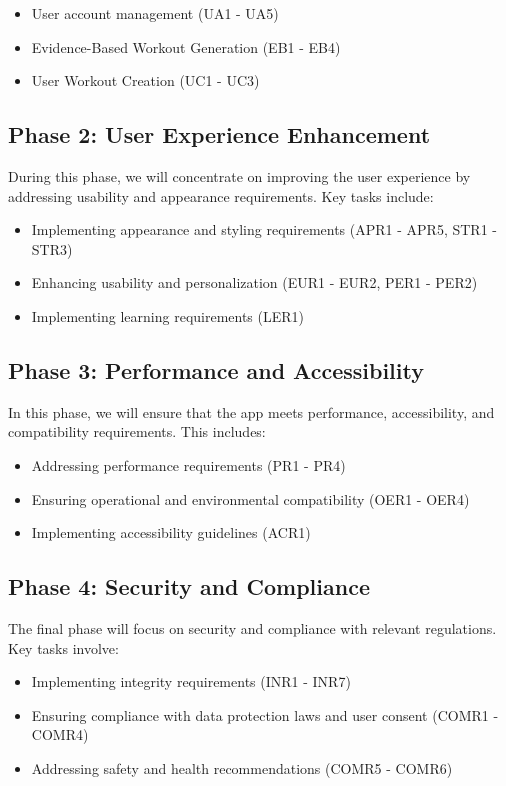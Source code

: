 \documentclass[12pt]{article}
\begin{document}
\begin{itemize}
    \item User account management (UA1 - UA5)
    \item Evidence-Based Workout Generation (EB1 - EB4)
    \item User Workout Creation (UC1 - UC3)
\end{itemize}

\subsection{Phase 2: User Experience Enhancement}

During this phase, we will concentrate on improving the user experience by addressing usability and appearance requirements. Key tasks include:

\begin{itemize}
\item Implementing appearance and styling requirements (APR1 - APR5, STR1 - STR3)
\item Enhancing usability and personalization (EUR1 - EUR2, PER1 - PER2)
\item Implementing learning requirements (LER1)
\end{itemize}

\subsection{Phase 3: Performance and Accessibility}

In this phase, we will ensure that the app meets performance, accessibility, and compatibility requirements. This includes:

\begin{itemize}
\item Addressing performance requirements (PR1 - PR4)
\item Ensuring operational and environmental compatibility (OER1 - OER4)
\item Implementing accessibility guidelines (ACR1)
\end{itemize}

\subsection{Phase 4: Security and Compliance}

The final phase will focus on security and compliance with relevant regulations. Key tasks involve:

\begin{itemize}
\item Implementing integrity requirements (INR1 - INR7)
\item Ensuring compliance with data protection laws and user consent (COMR1 - COMR4)
\item Addressing safety and health recommendations (COMR5 - COMR6)
\end{itemize}
\end{document}
